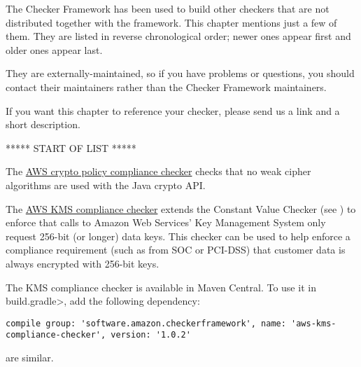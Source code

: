 \htmlhr
{}

The Checker Framework has been used to build other checkers that are not
distributed together with the framework.  This chapter mentions just a few
of them.  They are listed in reverse chronological order; newer ones appear
first and older ones appear last.

They are externally-maintained, so if you have problems or questions, you
should contact their maintainers rather than the Checker Framework
maintainers.

If you want this chapter to reference your checker,
please send us a link and a short description.




***** START OF LIST *****



The
\href{https://github.com/awslabs/aws-crypto-policy-compliance-checker}{AWS
  crypto policy compliance checker} checks that no weak cipher algorithms
are used with the Java crypto API\@.



The \href{https://github.com/awslabs/aws-kms-compliance-checker}{AWS KMS
  compliance checker} extends the Constant Value Checker (see
) to enforce that calls to Amazon
Web Services' Key Management System only request 256-bit (or longer) data
keys.  This checker can be used to help enforce a compliance requirement
(such as from SOC or PCI-DSS) that customer data is always encrypted with
256-bit keys.

The KMS compliance checker is available in Maven Central.  To use it in
\<build.gradle>, add the following dependency:

\begin{Verbatim}
compile group: 'software.amazon.checkerframework', name: 'aws-kms-compliance-checker', version: '1.0.2'
\end{Verbatim}

 are similar.




